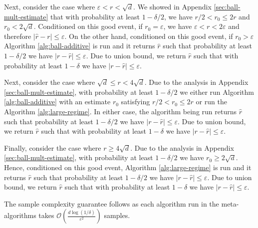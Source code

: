 Next, consider the case where $\varepsilon<r< \sqrt{d}$. We showed in Appendix \ref{sec:ball-mult-estimate} that with probability at least $1-\delta/2$, we have $r/2<r_0\leq 2r$ and $r_0<2\sqrt{d}$. Conditioned on this good event, if $r_0=\varepsilon$, we have $\varepsilon<r<2\varepsilon$ and therefore $|\hat r-r|\leq \varepsilon$. On the other hand, conditioned on this good event, if $r_0>\varepsilon$ Algorithm \ref{alg:ball-additive} is run and it returns $\hat r$ such that probability at least $1-\delta/2$ we have $|r-\hat r|\leq \varepsilon$. Due to union bound, we return $\hat r$ such that with probability at least $1-\delta$ we have $|r-\hat r|\leq \varepsilon$.

Next, consider the case where $\sqrt{d}\leq r<4\sqrt{d}$. Due to the analysis in Appendix \ref{sec:ball-mult-estimate}, with probability at least $1-\delta/2$ we either run Algorithm \ref{alg:ball-additive} with an estimate $r_0$ satisfying $r/2<r_0\leq 2r$ or run the Algorithm \ref{alg:large-regime}. In either case, the algorithm being run returns $\hat r$ such that probability at least $1-\delta/2$ we have $|r-\hat r|\leq \varepsilon$. Due to union bound, we return $\hat r$ such that with probability at least $1-\delta$ we have $|r-\hat r|\leq \varepsilon$.

Finally, consider the case where $r\geq 4\sqrt{d}$. Due to the analysis in Appendix \ref{sec:ball-mult-estimate}, with probability at least $1-\delta/2$ we have $r_0\geq 2\sqrt{d}$. Hence, conditioned on this good event, Algorithm \ref{alg:large-regime} is run and it returns $\hat r$ such that probability at least $1-\delta/2$ we have $|r-\hat r|\leq \varepsilon$. Due to union bound, we return $\hat r$ such that with probability at least $1-\delta$ we have $|r-\hat r|\leq \varepsilon$.


The sample complexity guarantee follows as each algorithm run in the meta-algorithms takes $\mathcal{O}\left(\frac{d\log(1/\delta)}{\varepsilon^2}\right)$ samples.



